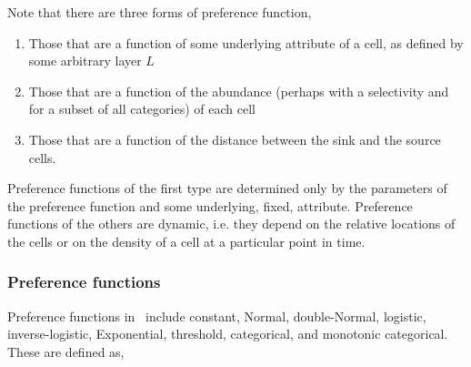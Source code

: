 Note that there are three forms of preference function,
\begin{enumerate}
\item Those that are a function of some underlying attribute of a cell, as defined by some arbitrary layer $L$
\item Those that are a function of the abundance (perhaps with a selectivity and for a subset of all categories) of each cell
\item Those that are a function of the distance between the sink and the source cells. 
\end{enumerate} 

Preference functions of the first type are determined only by the parameters of the preference function and some underlying, fixed, attribute. Preference functions of the others are dynamic, i.e. they depend on the relative locations of the cells or on the density of a cell at a particular point in time.

\subsubsection*{Preference functions}

Preference functions in \SPM\ include constant, Normal, double-Normal, logistic, inverse-logistic, Exponential, threshold, categorical, and monotonic categorical. These are defined as,

